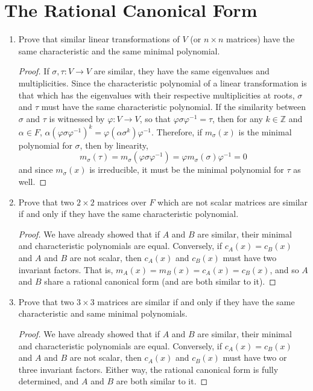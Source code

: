 \documentclass{report}
\newcommand{\Z}{\mathbb{Z}}
\begin{document}
\section{The Rational Canonical Form}
\begin{enumerate} 
	\item Prove that similar linear transformations of $V$ (or $n\times n$ matrices) have the same characteristic and the same minimal polynomial.
		\begin{proof}
			If $\sigma,\tau:V\to V$ are similar, they have the same eigenvalues and multiplicities. Since the characteristic polynomial of a linear transformation
			is that which has the eigenvalues with their respective multiplicities at roots, $\sigma$ and $\tau$ must have the same characteristic polynomial.
			If the similarity between $\sigma$ and $\tau$ is witnessed by $\varphi:V\to V$, so that $\varphi\sigma\varphi^{-1}=\tau$, then for any $k\in\Z$ and $\alpha\in F$,
			$\alpha(\varphi\sigma\varphi^{-1})^k=\varphi(\alpha\sigma^k)\varphi^{-1}$. Therefore, if $m_\sigma(x)$ is the minimal polynomial for $\sigma$,
			then by linearity,
			$$m_\sigma(\tau)=m_\sigma(\varphi\sigma\varphi^{-1})=\varphi m_\sigma(\sigma)\varphi^{-1}=0$$
			and since $m_\sigma(x)$ is irreducible, it must be the minimal polynomial for $\tau$ as well.
		\end{proof}
		\setcounter{enumi}{2}
	\item Prove that two $2\times 2$ matrices over $F$ which are not scalar matrices are similar if and only if they have the same characteristic polynomial.
		\begin{proof}
			We have already showed that if $A$ and $B$ are similar, their minimal and characteristic polynomials are equal.
			Conversely, if $c_A(x)=c_B(x)$ and $A$ and $B$ are not scalar, then $c_A(x)$ and $c_B(x)$ must have two invariant factors.
			That is, $m_A(x)=m_B(x)=c_A(x)=c_B(x)$, and so $A$ and $B$ share a rational canonical form (and are both similar to it).
		\end{proof}
	\item Prove that two $3\times 3$ matrices are similar if and only if they have the same characteristic and same minimal polynomials.
		\begin{proof}
			We have already showed that if $A$ and $B$ are similar, their minimal and characteristic polynomials are equal.
			Conversely, if $c_A(x)=c_B(x)$ and $A$ and $B$ are not scalar, then $c_A(x)$ and $c_B(x)$ must have two or three invariant factors.
			Either way, the rational canonical form is fully determined, and $A$ and $B$ are both similar to it.
			\newline


\end{proof}
\end{enumerate}
\end{document}
